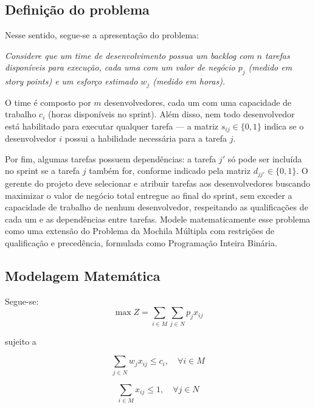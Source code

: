 \documentclass[12pt]{article}
\begin{document}
\subsection{Definição do problema}
Nesse sentido, segue-se a apresentação do problema:


\begin{problembox}
    \color{gray!80!black} %
    \itshape %
    Considere que um time de desenvolvimento possua um backlog com $n$ tarefas disponíveis para execução, cada uma com um valor de negócio $p_j$ (medido em \textit{story points}) e um esforço estimado $w_j$ (medido em horas). 

O time é composto por $m$ desenvolvedores, cada um com uma capacidade de trabalho $c_i$ (horas disponíveis no sprint). Além disso, nem todo desenvolvedor está habilitado para executar qualquer tarefa — a matriz $s_{ij} \in \{0,1\}$ indica se o desenvolvedor $i$ possui a habilidade necessária para a tarefa $j$. 

Por fim, algumas tarefas possuem dependências: a tarefa $j'$ só pode ser incluída no sprint se a tarefa $j$ também for, conforme indicado pela matriz $d_{jj'} \in \{0,1\}$. O gerente do projeto deve selecionar e atribuir tarefas aos desenvolvedores buscando maximizar o valor de negócio total entregue ao final do sprint, sem exceder a capacidade de trabalho de nenhum desenvolvedor, respeitando as qualificações de cada um e as dependências entre tarefas. Modele matematicamente esse problema como uma extensão do Problema da Mochila Múltipla com restrições de qualificação e precedência, formulada como Programação Inteira Binária.
\end{problembox}


\subsection{Modelagem Matemática}
Segue-se: 
\begin{equation}
\max Z = \sum_{i \in M}\sum_{j \in N} p_j x_{ij}
\end{equation}

sujeito a

\begin{equation}
\sum_{j \in N} w_j x_{ij} \le c_i,
\quad \forall i \in M
\end{equation}

\begin{equation}
\sum_{i \in M} x_{ij} \le 1,
\quad \forall j \in N
\end{equation}
\end{document}
